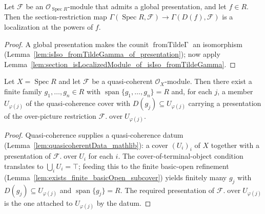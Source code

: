 \begin{lemma}\leanok
  \label{lem:section_isLocalizedModule_of_presentation}
  Let \(\mathcal{F}\) be an \(\mathcal{O}_{\operatorname{Spec} R}\)-module that admits a global
  presentation, and let \(f \in R\). Then the section-restriction map
  \(\Gamma(\operatorname{Spec} R, \mathcal{F}) \to \Gamma(D(f), \mathcal{F})\) is a localization at the
  powers of \(f\).
\end{lemma}
\begin{proof}
    \leanok
  A global presentation makes the counit \(\operatorname{fromTilde\Gamma}\) an isomorphism
  (Lemma~\ref{lem:isIso_fromTildeGamma_of_presentation}); now apply
  Lemma~\ref{lem:section_isLocalizedModule_of_isIso_fromTildeGamma}.
\end{proof}

\begin{lemma}
  \label{lem:qcoh_finite_presentation_cover}
  Let \(X = \operatorname{Spec} R\) and let \(\mathcal{F}\) be a quasi-coherent
  \(\mathcal{O}_X\)-module. Then there exist a finite family \(g_1, \ldots, g_n \in R\) with
  \(\operatorname{span}\{g_1, \ldots, g_n\} = R\) and, for each \(j\), a member \(U_{\varphi(j)}\) of
  the quasi-coherence cover with \(D(g_j) \subseteq U_{\varphi(j)}\) carrying a presentation of the
  over-picture restriction \(\mathcal{F}.\operatorname{over} U_{\varphi(j)}\).
\end{lemma}
\begin{proof}
  Quasi-coherence supplies a quasi-coherence datum (Lemma~\ref{lem:quasicoherentData_mathlib}): a cover
  \((U_i)_i\) of \(X\) together with a presentation of \(\mathcal{F}.\operatorname{over} U_i\) for each
  \(i\). The cover-of-terminal-object condition translates to \(\bigcup_i U_i = \top\); feeding this to
  the finite basic-open refinement (Lemma~\ref{lem:exists_finite_basicOpen_subcover}) yields finitely
  many \(g_j\) with \(D(g_j) \subseteq U_{\varphi(j)}\) and \(\operatorname{span}\{g_j\} = R\). The
  required presentation of \(\mathcal{F}.\operatorname{over} U_{\varphi(j)}\) is the one attached to
  \(U_{\varphi(j)}\) by the datum.
\end{proof}

